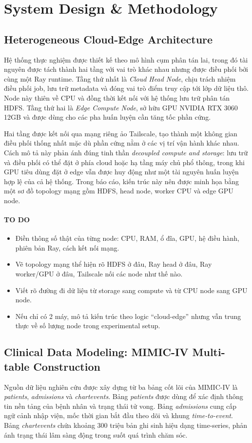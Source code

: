 \section{System Design \& Methodology}

\subsection{Heterogeneous Cloud-Edge Architecture}
Hệ thống thực nghiệm được thiết kế theo mô hình cụm phân tán lai, trong đó tài nguyên được tách thành hai tầng với vai trò khác nhau nhưng được điều phối bởi cùng một Ray runtime. Tầng thứ nhất là \textit{Cloud Head Node}, chịu trách nhiệm điều phối job, lưu trữ metadata và đóng vai trò điểm truy cập tới lớp dữ liệu thô. Node này thiên về CPU và đồng thời kết nối với hệ thống lưu trữ phân tán HDFS. Tầng thứ hai là \textit{Edge Compute Node}, sở hữu GPU NVIDIA RTX 3060 12GB và được dùng cho các pha huấn luyện cần tăng tốc phần cứng.

Hai tầng được kết nối qua mạng riêng ảo Tailscale, tạo thành một không gian điều phối thống nhất mặc dù phần cứng nằm ở các vị trí vận hành khác nhau. Cách mô tả này phản ánh đúng tinh thần \textit{decoupled compute and storage}: lưu trữ và điều phối có thể đặt ở phía cloud hoặc hạ tầng máy chủ phổ thông, trong khi GPU tiêu dùng đặt ở edge vẫn được huy động như một tài nguyên huấn luyện hợp lệ của cả hệ thống. Trong báo cáo, kiến trúc này nên được minh họa bằng một sơ đồ topology mạng gồm HDFS, head node, worker CPU và edge GPU node.

\paragraph{TO DO}
\begin{itemize}
    \item Điền thông số thật của từng node: CPU, RAM, ổ đĩa, GPU, hệ điều hành, phiên bản Ray, cách kết nối mạng.
    \item Vẽ topology mạng thể hiện rõ HDFS ở đâu, Ray head ở đâu, Ray worker/GPU ở đâu, Tailscale nối các node như thế nào.
    \item Viết rõ đường đi dữ liệu từ storage sang compute và từ CPU node sang GPU node.
    \item Nếu chỉ có 2 máy, mô tả kiến trúc theo logic ``cloud-edge'' nhưng vẫn trung thực về số lượng node trong experimental setup.
\end{itemize}

\subsection{Clinical Data Modeling: MIMIC-IV Multi-table Construction}
Nguồn dữ liệu nghiên cứu được xây dựng từ ba bảng cốt lõi của MIMIC-IV là \textit{patients}, \textit{admissions} và \textit{chartevents}. Bảng \textit{patients} được dùng để xác định thông tin nền tảng của bệnh nhân và trạng thái tử vong. Bảng \textit{admissions} cung cấp ngữ cảnh nhập viện, mốc thời gian bắt đầu theo dõi và khung \textit{time-to-event}. Bảng \textit{chartevents} chứa khoảng 300 triệu bản ghi sinh hiệu dạng time-series, phản ánh trạng thái lâm sàng động trong suốt quá trình chăm sóc.

